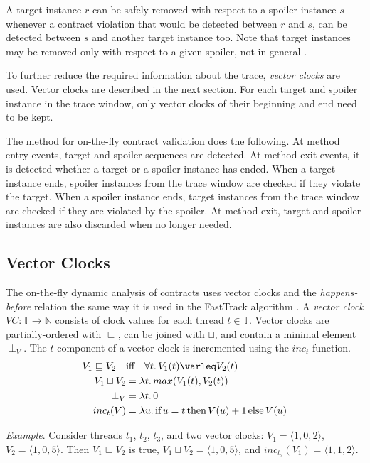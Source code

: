 A target instance $r$ can be safely removed with respect to a spoiler instance
$s$ whenever a contract violation that would be detected between $r$ and $s$,
can be detected between $s$ and another target instance too. Note that target
instances may be removed only with respect to a given spoiler, not in general
\cite{contracts}.

To further reduce the required information about the trace, \emph{vector clocks}
are used. Vector clocks are described in the next section. For each target and
spoiler instance in the trace window, only vector clocks of their beginning and
end need to be kept.

The method for on-the-fly contract validation does the following. At method
entry events, target and spoiler sequences are detected. At method exit events,
it is detected whether a target or a spoiler instance has ended. When a target
instance ends, spoiler instances from the trace window are checked if they
violate the target. When a spoiler instance ends, target instances from the
trace window are checked if they are violated by the spoiler. At method exit,
target and spoiler instances are also discarded when no longer needed.

\subsection{Vector Clocks}

The on-the-fly dynamic analysis of contracts uses vector clocks and the
\emph{happens-before} relation the same way it is used in the FastTrack
algorithm \cite{fasttrack}. A \emph{vector clock} $VC: \mathbb{T} \rightarrow
\mathbb{N}$ consists of clock values for each thread $t \in \mathbb{T}$. Vector
clocks are partially-ordered with $\sqsubseteq$, can be joined with $\sqcup$,
and contain a minimal element $\perp_V$. The $t$-component of a vector clock is
incremented using the $inc_t$ function.
\begin{align*}
    V_1 \sqsubseteq V_2 \quad &\text{iff} \quad \forall t. \, V_1(t) \varleq
    V_2(t) \\
    V_1 \sqcup V_2 &= \lambda t. \, max(V_1(t), V_2(t)) \\
    \perp_V &= \lambda t. \, 0 \\
    inc_t(V) &= \lambda u. \, \text{if} \, u=t \, \text{then} \, V(u)+1 \,
    \text{else} \, V(u)
\end{align*}

\emph{Example}. Consider threads $t_1$, $t_2$, $t_3$, and two vector clocks:
$V_1 = \langle 1,0,2 \rangle$, $V_2 = \langle 1,0,5 \rangle$. Then $V_1
\sqsubseteq V_2$ is true, $V_1 \sqcup V_2 = \langle 1,0,5 \rangle$, and
$inc_{t_2}(V_1) = \langle 1,1,2 \rangle$.

